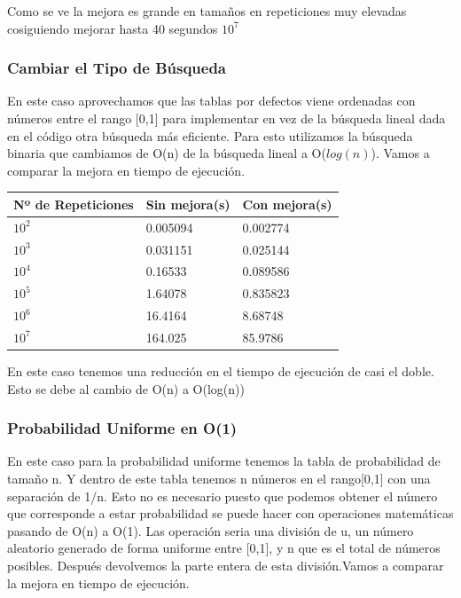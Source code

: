 \documentclass[]{article}
\begin{document}
Como se ve la mejora es grande en tamaños en repeticiones muy elevadas cosiguiendo mejorar hasta 40 segundos $10^{7}$

\subsubsection{Cambiar el Tipo de Búsqueda}
En este caso aprovechamos que las tablas por defectos viene ordenadas con números entre el rango [0,1] para implementar en vez de la búsqueda lineal dada en el código otra búsqueda más eficiente. Para esto utilizamos la búsqueda binaria que cambiamos de O(n) de la búsqueda lineal a O($log(n)$). Vamos a comparar la mejora en tiempo de ejecución.

\begin{table}[H]
	\begin{center}
		\begin{tabular}{|l|l|l|}
			
			\hline
			Nº de Repeticiones & Sin mejora(s) & Con mejora(s)\\
			\hline \hline
			$10^{2}$ & 0.005094  &  0.002774
			\\ \hline
			$10^{3}$ & 0.031151  &  0.025144
			\\ \hline
			$10^{4}$ & 0.16533  &  0.089586
			\\ \hline
			$10^{5}$ & 1.64078 &  0.835823
			\\ \hline
			$10^{6}$ &  16.4164 &  8.68748
			\\ \hline
			$10^{7}$ & 164.025  &  85.9786
			\\ \hline
		\end{tabular}
		
		\label{tabla:sencilla}
	\end{center}
\end{table}

En este caso tenemos una reducción en el tiempo de ejecución de casi el doble. Esto se debe al cambio de O(n) a O(log(n))

\subsubsection{Probabilidad Uniforme en O(1)}
En este caso para la probabilidad uniforme tenemos la tabla de probabilidad de tamaño n. Y dentro de este tabla tenemos n números en el rango[0,1] con una separación de 1/n. Esto no es necesario puesto que podemos obtener el número que corresponde a estar probabilidad se puede hacer con operaciones matemáticas pasando de O(n) a O(1). Las operación seria una división de u, un número aleatorio generado de forma uniforme entre [0,1], y n que es el total de números posibles. Después devolvemos la parte entera de esta división.Vamos a comparar la mejora en tiempo de ejecución.
\end{document}
